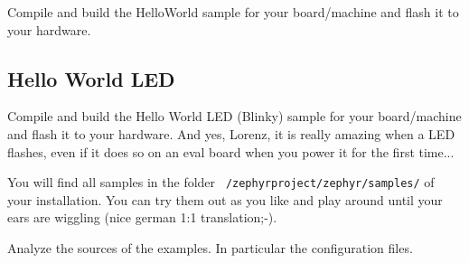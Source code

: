 \begin{exercise}
Compile and build the HelloWorld sample for your board/machine and flash it to your hardware. 
\end{exercise}





\subsection{Hello World LED}

\begin{exercise}
Compile and build the Hello World LED  (Blinky) sample for your board/machine and flash it to your hardware. 
And yes, Lorenz, it is really amazing when a LED flashes, even if it does so on an eval board when you power it for the first time... 

You will find all samples in the folder  \texttt{~/zephyrproject/zephyr/samples/} of your installation. You can try them out as you like and play around until your ears are wiggling (nice german 1:1 translation;-). 
\end{exercise}

\begin{exercise}
Analyze the sources of the examples. In particular the configuration files. 
\end{exercise}
